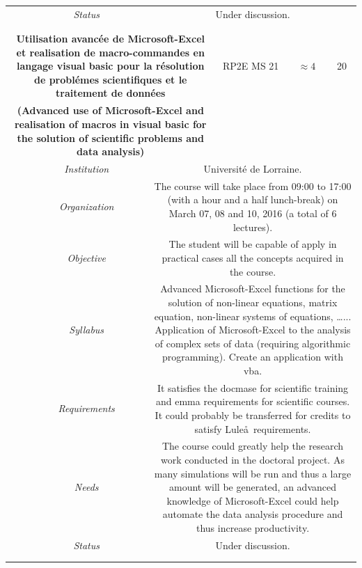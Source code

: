\documentclass[a4paper, twoside,12pt, abstract]{scrartcl} %
\begin{document}
\begin{center}
\begin{longtable}{cccccc}
    &\textit{Status}&\multicolumn{4}{p{0.7\textwidth}}{Under discussion.}\\
    &&&&&\\
    \midrule
    &&&&&\\
    \multicolumn{3}{p{0.5\textwidth}}{\textbf{Utilisation avanc\'ee de Microsoft-Excel et realisation de macro-commandes en langage visual basic pour la r\'esolution de probl\'emes scientifiques et le traitement de donn\'ees}}&RP2E MS 21&$\approx4$&20\\
    \multicolumn{3}{p{0.5\textwidth}}{\textbf{(Advanced use of Microsoft-Excel and realisation of macros in visual basic for the solution of scientific problems and data analysis)}}&&&\\
    &\textit{Institution}&\multicolumn{4}{p{0.7\textwidth}}{Universit\'e de Lorraine.}\\
    &\textit{Organization}&\multicolumn{4}{p{0.7\textwidth}}{The course will take place from 09:00 to 17:00 (with a hour and a half lunch-break) on March 07, 08 and 10, 2016 (a total of 6 lectures).}\\
    &\textit{Objective}&\multicolumn{4}{p{0.7\textwidth}}{The student will be capable of apply in practical cases all the concepts acquired in the course.}\\
    &\textit{Syllabus}&\multicolumn{4}{p{0.7\textwidth}}{Advanced Microsoft-Excel functions for the solution of non-linear equations, matrix equation, non-linear systems of equations, \dots... Application of Microsoft-Excel to the analysis of complex sets of data (requiring algorithmic programming). Create an application with \acrfull{vba}.}\\
    &\textit{Requirements}&\multicolumn{4}{p{0.7\textwidth}}{It satisfies the \acrshort{docmase} for scientific training and \acrshort{emma} requirements for scientific courses. It could probably be transferred for credits to satisfy Lule\aa\ requirements.}\\
    &\textit{Needs}&\multicolumn{4}{p{0.7\textwidth}}{The course could greatly help the research work conducted in the doctoral project. As many simulations will be run and thus a large amount will be generated, an advanced knowledge of Microsoft-Excel could help automate the data analysis procedure and thus increase productivity.}\\
    &\textit{Status}&\multicolumn{4}{p{0.7\textwidth}}{Under discussion.}\\
    &&&&&\\
    \midrule
    &&&&&\\

\end{longtable}
\end{center}
\end{document}
